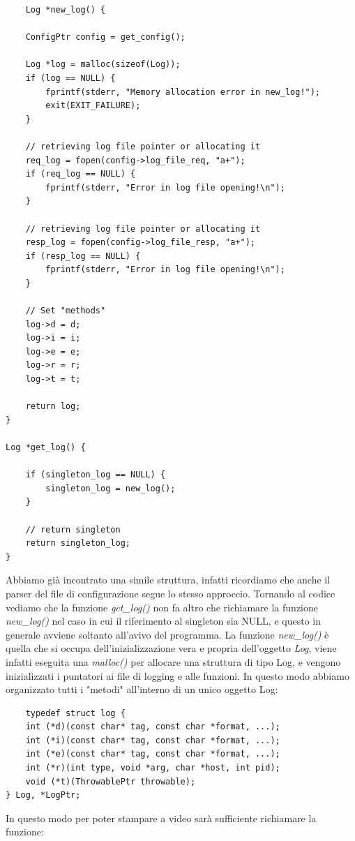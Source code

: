 \documentclass[italian]{tktltiki2}
\begin{document}
\begin{lstlisting}
	Log *new_log() {

    ConfigPtr config = get_config();

    Log *log = malloc(sizeof(Log));
    if (log == NULL) {
        fprintf(stderr, "Memory allocation error in new_log!");
        exit(EXIT_FAILURE);
    }
    
    // retrieving log file pointer or allocating it
    req_log = fopen(config->log_file_req, "a+");
    if (req_log == NULL) {
        fprintf(stderr, "Error in log file opening!\n");
    }

    // retrieving log file pointer or allocating it
    resp_log = fopen(config->log_file_resp, "a+");
    if (resp_log == NULL) {
        fprintf(stderr, "Error in log file opening!\n");
    }

    // Set "methods"
    log->d = d;
    log->i = i;
    log->e = e;
    log->r = r;
    log->t = t;

    return log;
}

Log *get_log() {

    if (singleton_log == NULL) {
        singleton_log = new_log();
    }

    // return singleton
    return singleton_log;
}
\end{lstlisting}
Abbiamo già incontrato una simile struttura, infatti ricordiamo che anche il parser del file di configurazione segue lo stesso approccio. Tornando al codice vediamo che la funzione \emph{get\_log()} non fa altro che richiamare la funzione \emph{new\_log()} nel caso in cui il riferimento al singleton sia NULL, e questo in generale avviene soltanto all'avivo del programma. La funzione \emph{new\_log()} è quella che si occupa dell'inizializzazione vera e propria dell'oggetto \emph{Log}, viene infatti eseguita una \emph{malloc()} per allocare una struttura di tipo Log, e vengono inizializzati i puntatori ai file di logging e alle funzioni. In questo modo abbiamo organizzato tutti i "metodi" all'interno di un unico oggetto Log:

\begin{lstlisting}
	typedef struct log {
    int (*d)(const char* tag, const char *format, ...);
    int (*i)(const char* tag, const char *format, ...);
    int (*e)(const char* tag, const char *format, ...);
    int (*r)(int type, void *arg, char *host, int pid);
    void (*t)(ThrowablePtr throwable);
} Log, *LogPtr;
\end{lstlisting}

In questo modo per poter stampare a video sarà sufficiente richiamare la funzione:
\end{document}
